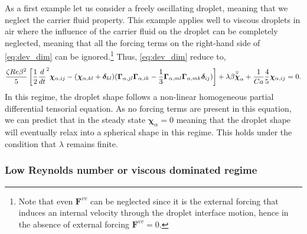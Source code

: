 As a first example let us consider a freely oscillating droplet, meaning that we neglect the carrier fluid property. 
This example applies well to viscous droplets in air where the influence of the carrier fluid on the droplet can be completely neglected, meaning that all the forcing terms on the right-hand side of \ref{eq:dev_dim} can be ignored.\footnote{
    Note that even $\textbf{F}^{vv}$ can be neglected since it is the external forcing that induces an internal velocity through the droplet interface motion, hence in the absence of external forcing  $\textbf{F}^{vv}=0$.  
} 
Thus, \ref{eq:dev_dim} reduce to, 
\begin{multline}
    \frac{\zeta Re \beta^2}{5}
    \left[
        \frac{1}{2}\frac{d}{dt}^2 \bm\chi_{\alpha,ij}
        -  ( \bm\chi_{\alpha,kl} +\bm\delta_{kl})
        (\bm\Gamma_{\alpha,jl}\bm\Gamma_{\alpha,ik}  
        - \frac{1}{3}
        \bm\Gamma_{\alpha,ml}\bm\Gamma_{\alpha,mk}  
        \bm\delta_{ij}
        )
    \right]
    + \lambda \beta \overset{ \triangledown  }{\bm\chi}_\alpha
    + \frac{1}{Ca}
    \frac{4  }{5} \bm\chi_{\alpha,ij}
    =
    0.
\end{multline}
In this regime, the droplet shape follows a non-linear homogeneous partial differential tensorial equation. 
As no forcing terms are present in this equation, we can predict that in the steady state $\bm\chi_\alpha = 0$ meaning that the droplet shape will eventually relax into a spherical shape in this regime.
This holds under the condition that $\lambda$ remains finite.   

\subsubsection{Low Reynolds number or viscous dominated regime}


